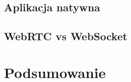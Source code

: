 \documentclass[language=polish,type=master]{aghmodern}
\begin{document}
\section{Aplikacja natywna}

\section{WebRTC vs WebSocket}

\chapter{Podsumowanie}

\backmatter

\cleardoublepage
\renewcommand\listoflistingscaption{Spis listingów}
\listoflistings

\cleardoublepage
\listoffigures

\cleardoublepage
\printbibliography
\end{document}
